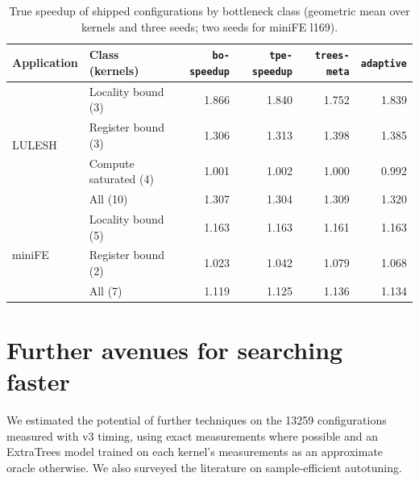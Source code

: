 \documentclass[10pt]{article}
\newcommand{\code}[1]{\texttt{#1}}
\begin{document}
\begin{table}[t]
\centering
\caption{True speedup of shipped configurations by bottleneck class
(geometric mean over kernels and three seeds; two seeds for miniFE l169).}
\label{tab:adaptive}
\begin{tabular}{llrrrr}
\toprule
Application & Class (kernels) & \code{bo-speedup} & \code{tpe-speedup} & \code{trees-meta} & \code{adaptive} \\
\midrule
\multirow{4}{*}{LULESH}
& Locality bound (3) & 1.866 & 1.840 & 1.752 & 1.839 \\
& Register bound (3) & 1.306 & 1.313 & 1.398 & 1.385 \\
& Compute saturated (4) & 1.001 & 1.002 & 1.000 & 0.992 \\
& All (10) & 1.307 & 1.304 & 1.309 & 1.320 \\
\midrule
\multirow{3}{*}{miniFE}
& Locality bound (5) & 1.163 & 1.163 & 1.161 & 1.163 \\
& Register bound (2) & 1.023 & 1.042 & 1.079 & 1.068 \\
& All (7) & 1.119 & 1.125 & 1.136 & 1.134 \\
\bottomrule
\end{tabular}
\end{table}

\section{Further avenues for searching faster}
\label{sec:efficiency}

We estimated the potential of further techniques on the 13259 configurations
measured with v3 timing, using exact measurements where possible and an
ExtraTrees model trained on each kernel's measurements as an approximate
oracle otherwise. We also surveyed the literature on sample-efficient
autotuning.
\end{document}
